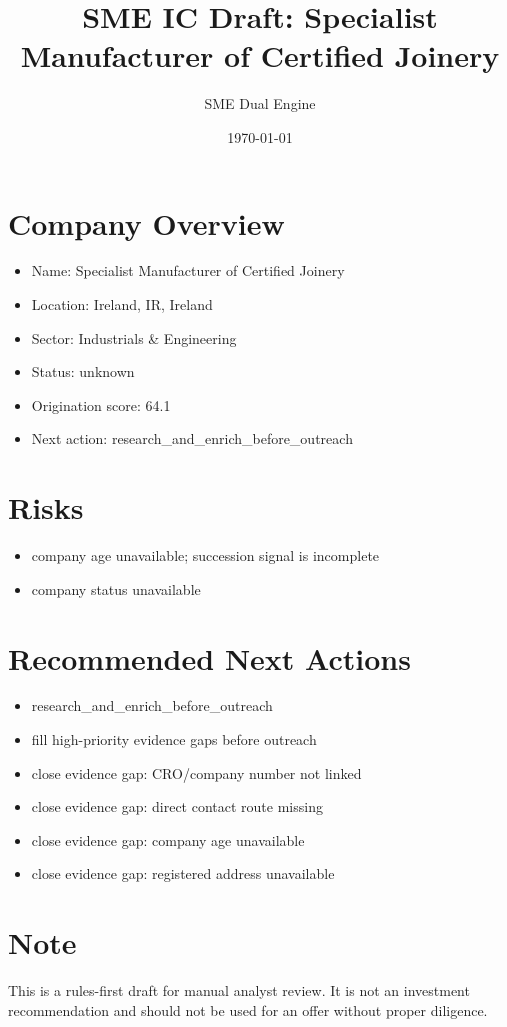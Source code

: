 \documentclass[11pt,a4paper]{article}
\title{SME IC Draft: Specialist Manufacturer of Certified Joinery}
\author{SME Dual Engine}
\date{\today}
\begin{document}
\maketitle
\section*{Company Overview}
\begin{itemize}[leftmargin=1.4em]
\item Name: Specialist Manufacturer of Certified Joinery
\item Location: Ireland, IR, Ireland
\item Sector: Industrials \& Engineering
\item Status: unknown
\item Origination score: 64.1
\item Next action: research\_and\_enrich\_before\_outreach
\end{itemize}
\section*{Risks}
\begin{itemize}[leftmargin=1.4em]
\item company age unavailable; succession signal is incomplete
\item company status unavailable
\end{itemize}
\section*{Recommended Next Actions}
\begin{itemize}[leftmargin=1.4em]
\item research\_and\_enrich\_before\_outreach
\item fill high-priority evidence gaps before outreach
\item close evidence gap: CRO/company number not linked
\item close evidence gap: direct contact route missing
\item close evidence gap: company age unavailable
\item close evidence gap: registered address unavailable
\end{itemize}
\section*{Note}
This is a rules-first draft for manual analyst review. It is not an investment
recommendation and should not be used for an offer without proper diligence.
\end{document}
